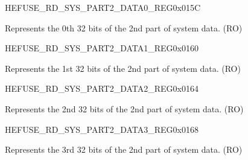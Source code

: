 \begin{register}{H}{EFUSE\_RD\_SYS\_PART2\_DATA0\_REG}{0x015C}\label{regdesc:EFUSERDSYSPART2DATA0REG}
%
\regnewline%
\begin{regdesc}\begin{reglist}
\label{fielddesc:EFUSESYSDATAPART20}\item [EFUSE\_SYS\_DATA\_PART2\_0] Represents the 0th 32 bits of the 2nd part of system data. (RO)
\end{reglist}\end{regdesc}
\end{register}


\begin{register}{H}{EFUSE\_RD\_SYS\_PART2\_DATA1\_REG}{0x0160}\label{regdesc:EFUSERDSYSPART2DATA1REG}
%
\regnewline%
\begin{regdesc}\begin{reglist}
\label{fielddesc:EFUSESYSDATAPART21}\item [EFUSE\_SYS\_DATA\_PART2\_1] Represents the 1st 32 bits of the 2nd part of system data. (RO)
\end{reglist}\end{regdesc}
\end{register}


\begin{register}{H}{EFUSE\_RD\_SYS\_PART2\_DATA2\_REG}{0x0164}\label{regdesc:EFUSERDSYSPART2DATA2REG}
%
\regnewline%
\begin{regdesc}\begin{reglist}
\label{fielddesc:EFUSESYSDATAPART22}\item [EFUSE\_SYS\_DATA\_PART2\_2] Represents the 2nd 32 bits of the 2nd part of system data. (RO)
\end{reglist}\end{regdesc}
\end{register}


\begin{register}{H}{EFUSE\_RD\_SYS\_PART2\_DATA3\_REG}{0x0168}\label{regdesc:EFUSERDSYSPART2DATA3REG}
%
\regnewline%
\begin{regdesc}\begin{reglist}
\label{fielddesc:EFUSESYSDATAPART23}\item [EFUSE\_SYS\_DATA\_PART2\_3] Represents the 3rd 32 bits of the 2nd part of system data. (RO)
\end{reglist}\end{regdesc}
\end{register}


